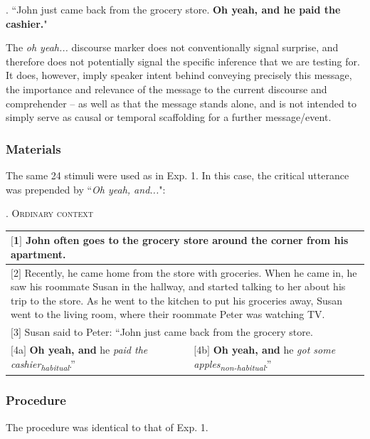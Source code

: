 \documentclass{sp}\usepackage[]{graphicx}\usepackage[]{color}
\begin{document}
\ex. ``John just came back from the grocery store.  \textbf{Oh yeah, and he paid the cashier.}"

The \textit{oh yeah...} discourse marker does not conventionally signal surprise, and therefore does not potentially signal the specific inference that we are testing for. It does, however, imply speaker intent behind conveying precisely this message, the importance and relevance of the message to the current discourse and comprehender -- as well as that the message stands alone, and is not intended to simply serve as causal or temporal scaffolding for a further message/event.

\subsubsection{Materials}

The same 24 stimuli were used as in Exp. 1. In this case, the critical utterance was prepended by ``\textit{Oh yeah, and...}":

\ex.\label{ex:habitual2} \centering\textsc{Ordinary context}
\vspace{-0.1cm}
\centering

\begin{longtable}{p{}|p{}}
\multicolumn{2}{p{0.9\textwidth}}{$[$1$]$ John often goes to the grocery store around the corner from his apartment.} \\
\hline
\multicolumn{2}{p{0.9\textwidth}}{$[$2$]$ Recently, he came home from the store with groceries.  When he came in, he saw his roommate Susan in the hallway, and started talking to her about his trip to the store.  As he went to the kitchen to put his groceries away, Susan went to the living room, where their roommate Peter was watching TV.} \\
\hline
\multicolumn{2}{p{0.9\textwidth}}{$[$3$]$ Susan said to Peter: ``John just came back from the grocery store.} \\
\hline
$[$4a$]$ \textbf{Oh yeah, and} he \textit{paid the \mbox{cashier\textsubscript{habitual}}}.'' & $[$4b$]$ \textbf{Oh yeah, and} he \textit{got some apples\textsubscript{non-habitual}}.''
\end{longtable}
\addtocounter{table}{-1}

\subsubsection{Procedure}

The procedure was identical to that of Exp. 1.
\end{document}
